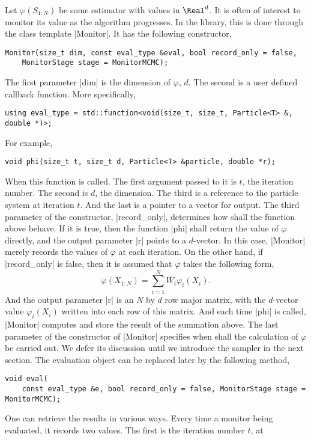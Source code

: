Let $\varphi(S_{1:N})$ be some estimator with values in $\Real^d$. It is often
of interest to monitor its value as the algorithm progresses. In the library,
this is done through the class template |Monitor|. It has the following
constructor,
\begin{verbatim}
Monitor(size_t dim, const eval_type &eval, bool record_only = false,
    MonitorStage stage = MonitorMCMC);
\end{verbatim}
The first parameter |dim| is the dimension of $\varphi$, $d$. The second is a
user defined callback function. More specifically,
\begin{verbatim}
using eval_type = std::function<void(size_t, size_t, Particle<T> &, double *)>;
\end{verbatim}
For example,
\begin{verbatim}
void phi(size_t t, size_t d, Particle<T> &particle, double *r);
\end{verbatim}
When this function is called. The first argument passed to it is $t$, the
iteration number. The second is $d$, the dimension. The third is a reference to
the particle system at iteration $t$. And the last is a pointer to a vector for
output. The third parameter of the constructor, |record_only|, determines how
shall the function above behave. If it is true, then the function |phi| shall
return the value of $\varphi$ directly, and the output parameter |r| points to
a $d$-vector. In this case, |Monitor| merely records the values of $\varphi$ at
each iteration. On the other hand, if |record_only| is false, then it is
assumed that $\varphi$ takes the following form,
\begin{equation*}
  \varphi(X_{1:N}) = \sum_{i=1}^N W_i \varphi_i(X_i).
\end{equation*}
And the output parameter |r| is an $N$ by $d$ row major matrix, with the
$d$-vector value $\varphi_i(X_i)$ written into each row of this matrix. And
each time |phi| is called, |Monitor| computes and store the result of the
summation above. The last parameter of the constructor of |Monitor| specifies
when shall the calculation of $\varphi$ be carried out. We defer its discussion
until we introduce the sampler in the next section. The evaluation object can
be replaced later by the following method,
\begin{verbatim}
void eval(
    const eval_type &e, bool record_only = false, MonitorStage stage = MonitorMCMC);
\end{verbatim}
One can retrieve the results in various ways. Every time a monitor being
evaluated, it records two values. The first is the iteration number $t$, at
